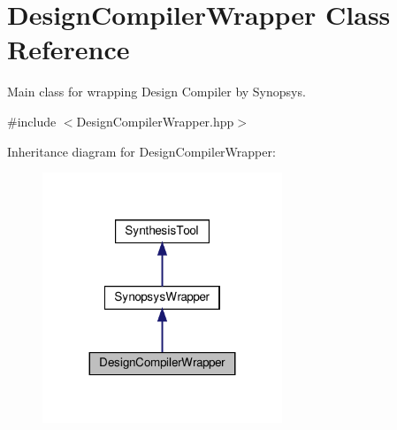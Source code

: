 \hypertarget{classDesignCompilerWrapper}{}\section{Design\+Compiler\+Wrapper Class Reference}
\label{classDesignCompilerWrapper}


Main class for wrapping Design Compiler by Synopsys.  




{\ttfamily \#include $<$Design\+Compiler\+Wrapper.\+hpp$>$}



Inheritance diagram for Design\+Compiler\+Wrapper\+:
\nopagebreak
\begin{figure}[H]
\begin{center}
\leavevmode
\includegraphics[width=203pt]{d3/d0c/classDesignCompilerWrapper__inherit__graph}
\end{center}
\end{figure}


